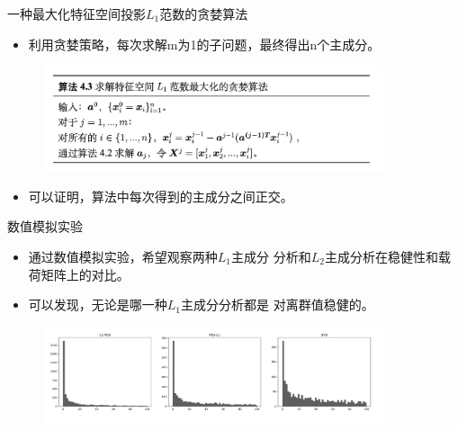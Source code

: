 \begin{frame}{一种最大化特征空间投影$L_1$范数的贪婪算法}
    \begin{itemize}
        \item 利用贪婪策略，每次求解m为1的子问题，最终得出n个主成分。
    \end{itemize} 
    \begin{figure}
        \includegraphics[width=10cm]{pics/kwak-2.png}
    \end{figure}
    \begin{itemize}
        \item 可以证明，算法中每次得到的主成分之间正交。
    \end{itemize} 
\end{frame}


\begin{frame}{数值模拟实验}
    \begin{itemize}
        \item 通过数值模拟实验，希望观察两种$L_1$主成分
        分析和$L_2$主成分析在稳健性和载荷矩阵上的对比。
        \item 可以发现，无论是哪一种$L_1$主成分分析都是
        对离群值稳健的。
    \end{itemize} 
    \begin{figure}
        \includegraphics[width=10cm]{pics/compare-l1.png}
    \end{figure}

\end{frame}

